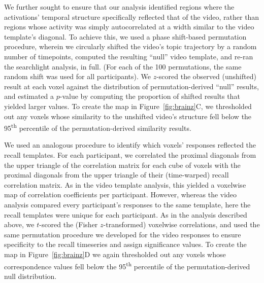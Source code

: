 \documentclass{article}
\begin{document}
We further sought to ensure that our analysis identified regions where the activations’ temporal structure specifically reflected that of the video, rather than regions whose activity was simply autocorrelated at a width similar to the video template’s diagonal.  To achieve this, we used a phase shift-based permutation procedure, wherein we circularly shifted the video’s topic trajectory by a random number of timepoints, computed the resulting ``null” video template, and re-ran the searchlight analysis, in full.  (For each of the 100 permutations, the same random shift was used for all participants).  We $z$-scored the observed (unshifted) result at each voxel against the distribution of permutation-derived ``null” results, and estimated a $p$-value by computing the proportion of shifted results that yielded larger values.  To create the map in Figure~\ref{fig:brainz}C, we thresholded out any voxels whose similarity to the unshifted video’s structure fell below the 95\textsuperscript{th} percentile of the permutation-derived similarity results.

We used an analogous procedure to identify which voxels' responses reflected the recall templates.  For each participant, we correlated the proximal diagonals from the upper triangle of the correlation matrix for each cube of voxels with the proximal diagonals from the upper triangle of their (time-warped) recall correlation matrix.  As in the video template analysis, this yielded a voxelwise map of correlation coefficients per participant.  However, whereas the video analysis compared every participant's responses to the same template, here the recall templates were unique for each participant.  As in the analysis described above, we $t$-scored the (Fisher $z$-transformed) voxelwise correlations, and used the same permutation procedure we developed for the video responses to ensure specificity to the recall timeseries and assign significance values.  To create the map in Figure~\ref{fig:brainz}D we again thresholded out any voxels whose correspondence values fell below the 95\textsuperscript{th} percentile of the permutation-derived null distribution.

\end{document}
